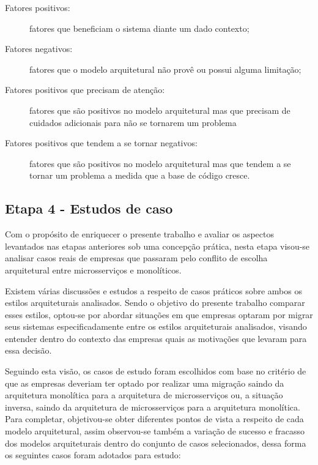 \begin{description}
    \item[Fatores positivos:] fatores que beneficiam o sistema diante um dado contexto;
    \item[Fatores negativos:] fatores que o modelo arquitetural não provê ou possui alguma limitação;
    \item[Fatores positivos que precisam de atenção:] fatores que são positivos no modelo
        arquitetural mas que precisam de cuidados adicionais para não se tornarem um problema
    \item[Fatores positivos que tendem a se tornar negativos:] fatores que são positivos no modelo
        arquitetural mas que tendem a se tornar um problema a medida que a base de código cresce.
\end{description}

\subsection{Etapa 4 - Estudos de caso}

Com o propósito de enriquecer o presente trabalho e avaliar os aspectos levantados nas etapas
anteriores sob uma concepção prática, nesta etapa visou-se analisar casos reais de empresas que
passaram pelo conflito de escolha arquitetural entre microsserviços e monolíticos.

Existem várias discussões e estudos a respeito de casos práticos sobre ambos os estilos
arquiteturais analisados. Sendo o objetivo do presente trabalho comparar esses estilos, optou-se por
abordar situações em que empresas optaram por migrar seus sistemas especificadamente entre os
estilos arquiteturais analisados, visando entender dentro do contexto das empresas quais as
motivações que levaram para essa decisão.

Seguindo esta visão, os casos de estudo foram escolhidos com base no critério de que as empresas deveriam
ter optado por realizar uma migração saindo da arquitetura monolítica para a arquitetura de microsserviços
ou, a situação inversa, saindo da arquitetura de microsserviços para a arquitetura monolítica. Para
completar, objetivou-se obter diferentes pontos de vista a respeito de cada modelo arquitetural,
assim observou-se também a variação de sucesso e fracasso dos modelos arquiteturais dentro do
conjunto de casos selecionados, dessa forma os seguintes casos foram adotados para estudo:

